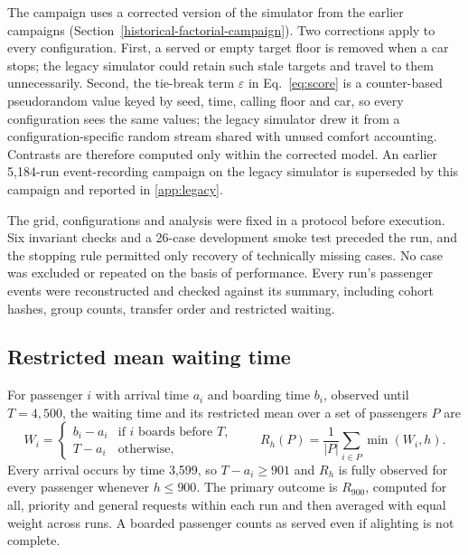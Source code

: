 The campaign uses a corrected version of the simulator from the earlier campaigns (Section~\ref{historical-factorial-campaign}). Two corrections apply to every configuration. First, a served or empty target floor is removed when a car stops; the legacy simulator could retain such stale targets and travel to them unnecessarily. Second, the tie-break term $\varepsilon$ in Eq.~\eqref{eq:score} is a counter-based pseudorandom value keyed by seed, time, calling floor and car, so every configuration sees the same values; the legacy simulator drew it from a configuration-specific random stream shared with unused comfort accounting. Contrasts are therefore computed only within the corrected model. An earlier 5,184-run event-recording campaign on the legacy simulator is superseded by this campaign and reported in \ref{app:legacy}.

The grid, configurations and analysis were fixed in a protocol before execution. Six invariant checks and a 26-case development smoke test preceded the run, and the stopping rule permitted only recovery of technically missing cases. No case was excluded or repeated on the basis of performance. Every run's passenger events were reconstructed and checked against its summary, including cohort hashes, group counts, transfer order and restricted waiting.

\subsection{Restricted mean waiting time}\label{fully-observed-restricted-waiting}

For passenger $i$ with arrival time $a_i$ and boarding time $b_i$, observed until $T=4{,}500$, the waiting time and its restricted mean over a set of passengers $P$ are
\begin{equation}
W_i=\begin{cases} b_i-a_i & \text{if } i \text{ boards before } T,\\ T-a_i & \text{otherwise},\end{cases}
\qquad
R_h(P)=\frac{1}{|P|}\sum_{i\in P}\min(W_i,h).
\label{eq:restricted}
\end{equation}
Every arrival occurs by time 3,599, so $T-a_i\ge 901$ and $R_h$ is fully observed for every passenger whenever $h\le 900$. The primary outcome is $R_{900}$, computed for all, priority and general requests within each run and then averaged with equal weight across runs. A boarded passenger counts as served even if alighting is not complete.

